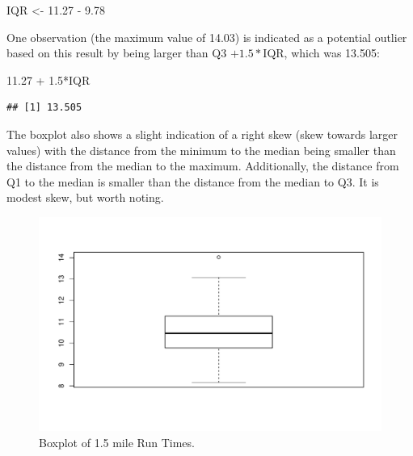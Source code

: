 \documentclass[]{article}
\newenvironment{Shaded}{\begin{snugshade}}{\end{snugshade}}
\newcommand{\KeywordTok}[1]{\textcolor[rgb]{0.13,0.29,0.53}{\textbf{{#1}}}}
\newcommand{\FloatTok}[1]{\textcolor[rgb]{0.00,0.00,0.81}{{#1}}}
\newcommand{\StringTok}[1]{\textcolor[rgb]{0.31,0.60,0.02}{{#1}}}
\newcommand{\NormalTok}[1]{{#1}}
\begin{document}
\begin{Shaded}
\begin{Highlighting}[]
\NormalTok{IQR <-}\StringTok{ }\FloatTok{11.27} \NormalTok{-}\StringTok{ }\FloatTok{9.78}
\end{Highlighting}
\end{Shaded}

One observation (the maximum value of 14.03) is indicated as a potential
outlier based on this result by being larger than Q3 \(+1.5*\)IQR, which
was 13.505:

\begin{Shaded}
\begin{Highlighting}[]
\FloatTok{11.27} \NormalTok{+}\StringTok{ }\FloatTok{1.5}\NormalTok{*IQR}
\end{Highlighting}
\end{Shaded}

\begin{verbatim}
## [1] 13.505
\end{verbatim}

The boxplot also shows a slight indication of a right skew (skew towards
larger values) with the distance from the minimum to the median being
smaller than the distance from the median to the maximum. Additionally,
the distance from Q1 to the median is smaller than the distance from the
median to Q3. It is modest skew, but worth noting.



\begin{Shaded}
\end{Shaded}

\begin{figure}[htbp]
\centering
\includegraphics{01-preface_files/figure-latex/Figure8-1.pdf}
\caption{\label{fig:Figure8}Boxplot of 1.5 mile Run Times.}
\end{figure}
\end{document}
